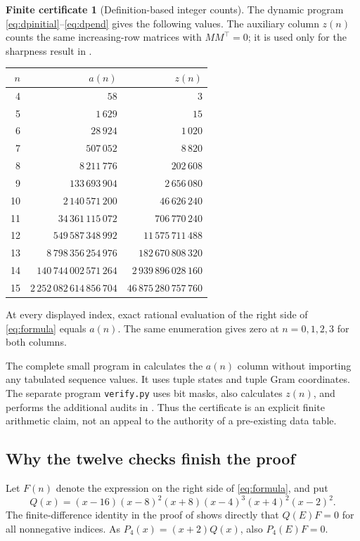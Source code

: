 \documentclass[11pt,letterpaper]{article}
\theoremstyle{definition}
\newtheorem{certificate}[theorem]{Finite certificate}
\newcommand{\1}{\mathbf 1}
\begin{document}
\begin{certificate}[Definition-based integer counts]\label{cert:counts}
The dynamic program \eqref{eq:dpinitial}--\eqref{eq:dpend} gives the following
values. The auxiliary column $z(n)$ counts the same increasing-row matrices
with $MM^\top=0$; it is used only for the sharpness result in
.
\begin{center}
\begin{tabular}{r@{\qquad}r@{\qquad}r}
\toprule
$n$ & $a(n)$ & $z(n)$\\
\midrule
4  & $58$                & $3$\\
5  & $1\,629$            & $15$\\
6  & $28\,924$           & $1\,020$\\
7  & $507\,052$          & $8\,820$\\
8  & $8\,211\,776$      & $202\,608$\\
9  & $133\,693\,904$    & $2\,656\,080$\\
10 & $2\,140\,571\,200$ & $46\,626\,240$\\
11 & $34\,361\,115\,072$ & $706\,770\,240$\\
12 & $549\,587\,348\,992$ & $11\,575\,711\,488$\\
13 & $8\,798\,356\,254\,976$ & $182\,670\,808\,320$\\
14 & $140\,744\,002\,571\,264$ & $2\,939\,896\,028\,160$\\
15 & $2\,252\,082\,614\,856\,704$ & $46\,875\,280\,757\,760$\\
\bottomrule
\end{tabular}
\end{center}
At every displayed index, exact rational evaluation of the right side of
\eqref{eq:formula} equals $a(n)$. The same enumeration gives zero at
$n=0,1,2,3$ for both columns.
\end{certificate}

The complete small program in  calculates the $a(n)$ column
without importing any tabulated sequence values. It uses tuple states and
tuple Gram coordinates. The separate program \texttt{verify.py} uses bit masks,
also calculates $z(n)$, and performs the additional audits in
. Thus the certificate is an explicit finite arithmetic
claim, not an appeal to the authority of a pre-existing data table.

\subsection{Why the twelve checks finish the proof}
Let $F(n)$ denote the expression on the right side of \eqref{eq:formula}, and
put
\begin{equation}\label{eq:Q}
 Q(x)=(x-16)(x-8)^2(x+8)(x-4)^3(x+4)^2(x-2)^2.
\end{equation}
The finite-difference identity in the proof of  shows directly
that $Q(E)F=0$ for all nonnegative indices. As $P_4(x)=(x+2)Q(x)$, also
$P_4(E)F=0$.
\end{document}
